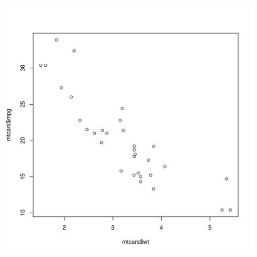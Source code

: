\documentclass[11pt]{article}\usepackage[]{graphicx}\usepackage[]{xcolor}
\makeatletter
\def\maxwidth{ %
  \ifdim\Gin@nat@width>\linewidth
    \linewidth
  \else
    \Gin@nat@width
  \fi
}
\newenvironment{kframe}{%
 \def\at@end@of@kframe{}%
 \ifinner\ifhmode%
  \def\at@end@of@kframe{\end{minipage}}%
  \begin{minipage}{\columnwidth}%
 \fi\fi%
 \def\FrameCommand##1{\hskip\@totalleftmargin \hskip-\fboxsep
 \colorbox{shadecolor}{##1}\hskip-\fboxsep
     \hskip-\linewidth \hskip-\@totalleftmargin \hskip\columnwidth}%
 \MakeFramed {\advance\hsize-\width
   \@totalleftmargin\z@ \linewidth\hsize
   \@setminipage}}%
 {\par\unskip\endMakeFramed%
 \at@end@of@kframe}
\newenvironment{knitrout}{}{} %
\makeatother
\begin{document}
\begin{knitrout}
\begin{kframe}
\end{kframe}
\includegraphics[width=\maxwidth]{figure/Q4-2} 
\end{knitrout}
\clearpage
\end{document}
